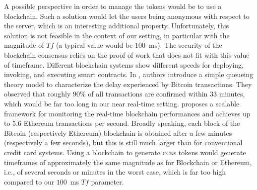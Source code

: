 \documentclass{llncs}
\begin{document}
A possible perspective in order to manage the tokens would be to use a blockchain.
Such a solution would let the users being anonymous with respect to the server, which is an interesting additional property.
Unfortunately, this solution is not feasible in the context of our setting, in particular with the magnitude of $Tf$ (a typical value would be $100$~ms). The security of the blockchain consensus relies on the proof of work that does not fit with this value of timeframe. Different blockchain systems show different speeds for deploying, invoking, and executing smart contracts. In \cite{Ricci2019}, authors introduce a simple queueing theory model to characterize the delay experienced by Bitcoin transactions. They observed that roughly 90\% of all transactions are confirmed within 33 minutes, which would be far too long in our near real-time setting. \cite{Zheng2018} proposes a scalable framework for monitoring the real-time blockchain performances and achieves up to 5.6 Ethereum transactions per second. Broadly speaking, each block of the Bitcoin (respectively Ethereum) blockchain is obtained after a few minutes (respectively a few seconds), but this is still much larger than for conventional credit card systems. Using a blockchain to generate \textsc{ccn}s tokens would generate timeframes of approximately the same magnitude as for Blockchain or Ethereum, i.e., of several seconds or minutes in the worst case, which is far too high compared to our $100$~ms $Tf$ parameter.



\end{document}
